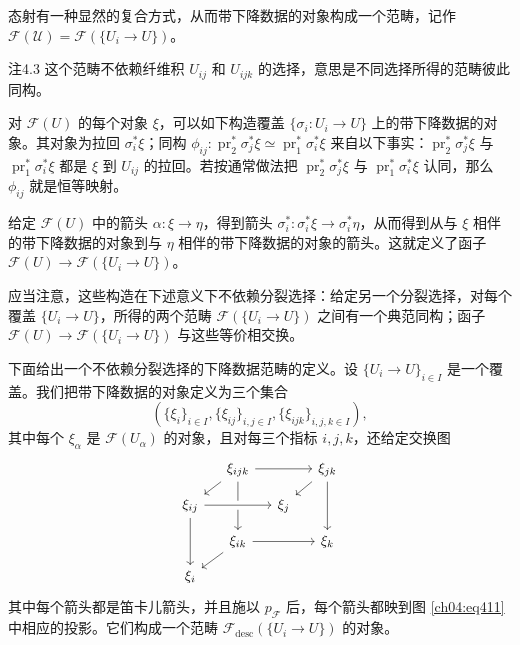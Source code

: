 态射有一种显然的复合方式，从而带下降数据的对象构成一个范畴，记作 $\mathcal F(\mathcal U)=\mathcal F(\{U_i\to U\})$。

\begin{origstatement}{注}{4.3}\label{ch04:rem43}
这个范畴不依赖纤维积 $U_{ij}$ 和 $U_{ijk}$ 的选择，意思是不同选择所得的范畴彼此同构。
\end{origstatement}

对 $\mathcal F(U)$ 的每个对象 $\xi$，可以如下构造覆盖 $\{\sigma_i\colon U_i\to U\}$ 上的带下降数据的对象。其对象为拉回 $\sigma_i^*\xi$；同构
$\phi_{ij}\colon\operatorname{pr}_2^*\sigma_j^*\xi\simeq\operatorname{pr}_1^*\sigma_i^*\xi$ 来自以下事实：$\operatorname{pr}_2^*\sigma_j^*\xi$ 与 $\operatorname{pr}_1^*\sigma_i^*\xi$ 都是 $\xi$ 到 $U_{ij}$ 的拉回。若按通常做法把 $\operatorname{pr}_2^*\sigma_j^*\xi$ 与 $\operatorname{pr}_1^*\sigma_i^*\xi$ 认同，那么 $\phi_{ij}$ 就是恒等映射。

给定 $\mathcal F(U)$ 中的箭头 $\alpha\colon\xi\to\eta$，得到箭头 $\sigma_i^*\colon\sigma_i^*\xi\to\sigma_i^*\eta$，从而得到从与 $\xi$ 相伴的带下降数据的对象到与 $\eta$ 相伴的带下降数据的对象的箭头。这就定义了函子 $\mathcal F(U)\to\mathcal F(\{U_i\to U\})$。

应当注意，这些构造在下述意义下不依赖分裂选择：给定另一个分裂选择，对每个覆盖 $\{U_i\to U\}$，所得的两个范畴 $\mathcal F(\{U_i\to U\})$ 之间有一个典范同构；函子 $\mathcal F(U)\to\mathcal F(\{U_i\to U\})$ 与这些等价相交换。

下面给出一个不依赖分裂选择的下降数据范畴的定义。设 $\{U_i\to U\}_{i\in I}$ 是一个覆盖。我们把带下降数据的对象定义为三个集合
\[
 (\{\xi_i\}_{i\in I},\{\xi_{ij}\}_{i,j\in I},\{\xi_{ijk}\}_{i,j,k\in I}),
\]
其中每个 $\xi_\alpha$ 是 $\mathcal F(U_\alpha)$ 的对象，且对每三个指标 $i,j,k$，还给定交换图
\[
\begin{tikzcd}[row sep=.9em,column sep=1.2em]
 &\xi_{ijk}\arrow[rr]\arrow[dl]\arrow[dd]&&\xi_{jk}\arrow[dl]\arrow[dd]\\
 \xi_{ij}\arrow[rr,crossing over]\arrow[dd]&&\xi_j\\
 &\xi_{ik}\arrow[rr]\arrow[dl]&&\xi_k\\
 \xi_i
\end{tikzcd}
\]
其中每个箭头都是笛卡儿箭头，并且施以 $p_{\mathcal F}$ 后，每个箭头都映到图 \eqref{ch04:eq411} 中相应的投影。它们构成一个范畴 $\mathcal F_{\mathrm{desc}}(\{U_i\to U\})$ 的对象。

